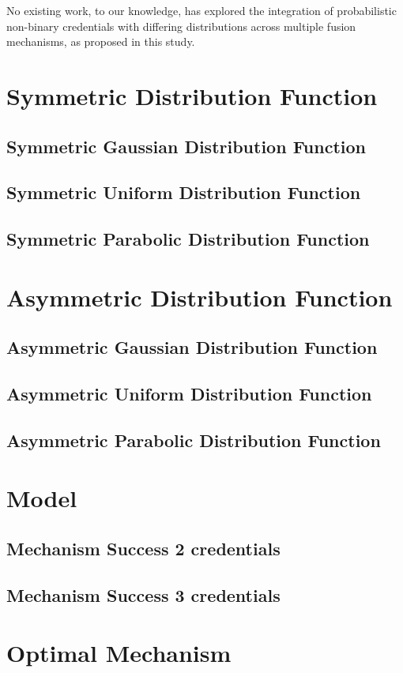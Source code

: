 \documentclass{article}
\begin{document}
No existing work, to our knowledge, has explored the integration of probabilistic non-binary credentials with differing distributions across
multiple fusion mechanisms, as proposed in this study.
\section{Symmetric Distribution Function}
\subsection{Symmetric Gaussian Distribution Function}
\subsection{Symmetric Uniform Distribution Function}
\subsection{Symmetric Parabolic Distribution Function}
\section{Asymmetric Distribution Function}
\subsection{Asymmetric Gaussian Distribution Function}
\subsection{Asymmetric Uniform Distribution Function}
\subsection{Asymmetric Parabolic Distribution Function}
\section{Model}
\subsection{Mechanism Success 2 credentials}
\subsection{Mechanism Success 3 credentials}
\section{Optimal Mechanism}
\end{document}
